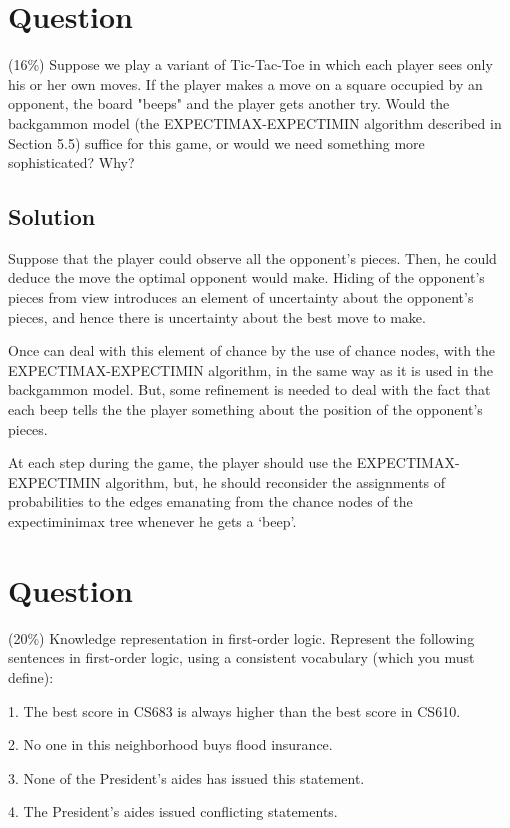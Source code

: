 \documentclass[a4paper,10pt]{article}
\begin{document}
\section{Question}

 (16\%) Suppose we play a variant of Tic-Tac-Toe in which each player sees only his or her own moves. If the player makes a move on a square occupied by an opponent, the board "beeps" and the player gets another try. Would the backgammon model (the EXPECTIMAX-EXPECTIMIN algorithm described in Section 5.5) suffice for this game, or would we need something more sophisticated? Why?

\subsection{Solution}

Suppose that the player could observe all the opponent's pieces. Then, he could deduce the move the optimal opponent would make. Hiding of the opponent's pieces from view introduces an element of uncertainty about the opponent's pieces, and hence there is uncertainty about the best move to make.

Once can deal with this element of chance by the use of chance nodes, with the EXPECTIMAX-EXPECTIMIN algorithm, in the same way as it is used in the backgammon model. But, some refinement is needed to deal with the fact that each beep tells the the player something about the position of the opponent's pieces.

At each step during the game, the player should use the EXPECTIMAX-EXPECTIMIN algorithm, but, he should reconsider the assignments of probabilities to the edges emanating from the chance nodes of the expectiminimax tree whenever he gets a `beep'.

\section{Question}
 (20\%) Knowledge representation in first-order logic. Represent the following sentences in first-order logic, using a consistent vocabulary (which you must define):

   1. The best score in CS683 is always higher than the best score in CS610.

   2. No one in this neighborhood buys flood insurance.

   3. None of the President's aides has issued this statement.

   4. The President's aides issued conflicting statements.
\end{document}
